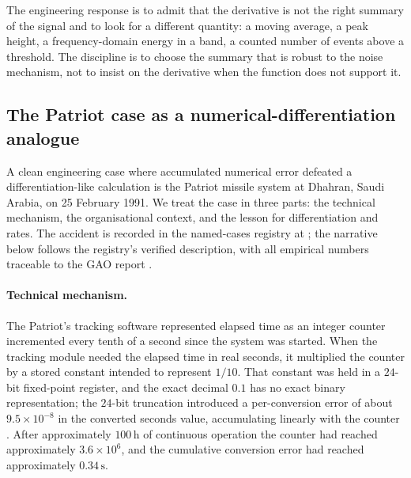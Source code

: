 The engineering response is to admit that the derivative is not
the right summary of the signal and to look for a different
quantity: a moving average, a peak height, a frequency-domain
energy in a band, a counted number of events above a threshold.
The discipline is to choose the summary that is robust to the
noise mechanism, not to insist on the derivative when the
function does not support it.

\subsection{The Patriot case as a numerical-differentiation
analogue}

A clean engineering case where accumulated numerical error
defeated a differentiation-like calculation is the Patriot missile
system at Dhahran, Saudi Arabia, on 25 February 1991. We treat the
case in three parts: the technical mechanism, the organisational
context, and the lesson for differentiation and rates. The accident
is recorded in the named-cases registry at
; the
narrative below follows the registry's verified description, with
all empirical numbers traceable to the GAO report
\cite{acc:gao-patriot-1992}.

\paragraph{Technical mechanism.}
The Patriot's tracking software represented elapsed time as an
integer counter incremented every tenth of a second since the
system was started. When the tracking module needed the elapsed
time in real seconds, it multiplied the counter by a stored
constant intended to represent $1/10$. That constant was held in a
$24$-bit fixed-point register, and the exact decimal $0.1$ has no
exact binary representation; the $24$-bit truncation introduced a
per-conversion error of about $9.5 \times 10^{-8}$ in the
converted seconds value, accumulating linearly with the counter
\cite{acc:gao-patriot-1992}. After approximately $100 \,\si{\hour}$
of continuous operation the counter had reached approximately
$3.6 \times 10^{6}$, and the cumulative conversion error had
reached approximately $0.34 \,\si{\second}$.

